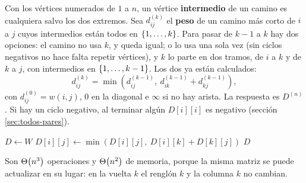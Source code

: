 \documentclass[11pt,letterpaper]{article}
\begin{document}
Con los vértices numerados de $1$ a $n$, un vértice
\textbf{intermedio} de un camino es cualquiera salvo los dos
extremos. Sea $d^{(k)}_{ij}$ el \textbf{peso} de un camino más corto
de $i$ a $j$ cuyos intermedios están todos en $\left\{ 1, \dots, k \right\}$.
Para pasar de $k - 1$ a $k$ hay dos opciones: el camino no usa $k$, y
queda igual; o lo usa una sola vez (sin ciclos negativos no hace
falta repetir vértices), y $k$ lo parte en dos tramos, de $i$ a $k$ y
de $k$ a $j$, con intermedios en $\left\{ 1, \dots, k - 1 \right\}$. Los dos ya
están calculados:
\[
  d^{(k)}_{ij} = \min\left( d^{(k-1)}_{ij},\
                 d^{(k-1)}_{ik} + d^{(k-1)}_{kj} \right) ,
\]
con $d^{(0)}_{ij} = w(i, j)$, $0$ en la diagonal e $\infty$ si no hay
arista. La respuesta es $D^{(n)}$. Si hay un ciclo negativo, al
terminar algún $D[i][i]$ es negativo (sección \ref{sec:todos-pares}).

\begin{algorithm}[H]
\caption{\textsc{Floyd}$(W, n)$}
\begin{algorithmic}[1]
\State $D \gets W$
      \State $D[i][j] \gets \min(D[i][j],\ D[i][k] + D[k][j])$
    \EndFor
  \EndFor
\EndFor
\State \Return $D$
\end{algorithmic}
\end{algorithm}

Son $\Theta\!\left(n^3\right)$ operaciones y $\Theta\!\left(n^2\right)$ de memoria, porque la misma
matriz se puede actualizar en su lugar: en la vuelta $k$ el renglón
$k$ y la columna $k$ no cambian.
\end{document}

